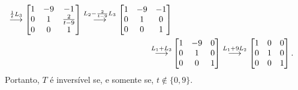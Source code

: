 \documentclass[12pt,a4paper]{article}
\newcommand{\grstep}[2][\relax]{%
   \ensuremath{\mathrel{
       {\mathop{\longrightarrow}\limits^{#2\mathstrut}_{
                                     \begin{subarray}{l} #1 \end{subarray}}}}}}
\begin{document}
\begin{enumerate}
\begin{align*}
\grstep{ \frac{1}{t} L_3 }
\begin{bmatrix}
1 & -9 & -1 \\
0 & 1 & \frac{2}{t-9} \\
0 & 0 & 1
\end{bmatrix}
\grstep{ L_2 -\frac{2}{t-9} L_3 }
\begin{bmatrix}
1 & -9 & -1 \\
0 & 1 & 0 \\
0 & 0 & 1
\end{bmatrix}\\
\grstep{ L_1 + L_3 }
&\begin{bmatrix}
1 & -9 & 0 \\
0 & 1 & 0 \\
0 & 0 & 1
\end{bmatrix}
\grstep{ L_1 + 9L_2 }
\begin{bmatrix}
1 & 0 & 0 \\
0 & 1 & 0 \\
0 & 0 & 1
\end{bmatrix}.
\end{align*}
Portanto, $T$ é inversível se, e somente se, $t \not \in \{0, 9\}$.


\end{enumerate}
\end{document}
